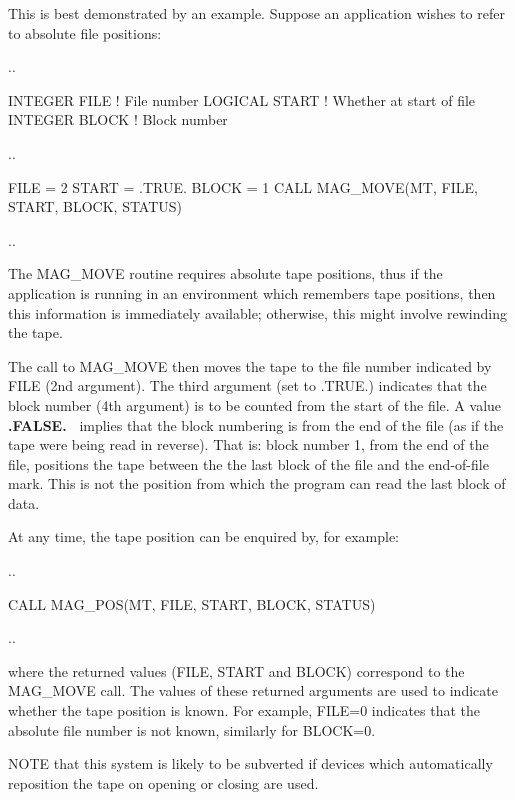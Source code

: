 \documentclass[11pt]{starlink}
\begin{document}
This is best demonstrated by an example. Suppose an application wishes
to refer to absolute file positions:

\begin{small}
\begin{terminalv}
..

INTEGER FILE                 ! File number
LOGICAL START                ! Whether at start of file
INTEGER BLOCK                ! Block number

..

FILE = 2
START = .TRUE.
BLOCK = 1
CALL MAG_MOVE(MT, FILE, START, BLOCK, STATUS)

..
\end{terminalv}
\end{small}

The MAG\_MOVE routine requires absolute tape positions, thus if the
application is running in an environment which remembers tape positions,
then this information is immediately available;  otherwise, this might
involve rewinding the tape.

The call to MAG\_MOVE then moves the tape to the file number indicated by
FILE (2nd argument).
The third argument (set to .TRUE.) indicates that the block number
(4th argument) is to be counted from the start of the file.
A value \textbf{.FALSE.\ } implies that the block numbering is from the end of the
file (as if the tape were being read in reverse). That is: block number 1,
from the end of the file, positions the tape between the the last block of
the file and the end-of-file mark. This is not the position from which the
program can read the last block of data.

At any time, the tape position can be enquired by, for example:

\begin{small}
\begin{terminalv}
..

CALL MAG_POS(MT, FILE, START, BLOCK, STATUS)

..
\end{terminalv}
\end{small}

where the returned values (FILE, START and BLOCK) correspond to the
MAG\_MOVE call. The values of these returned arguments are used to
indicate whether the tape position is known. For example, FILE=0
indicates that the absolute file number is not known, similarly for
BLOCK=0.

NOTE that this system is likely to be subverted if devices which automatically
reposition the tape on opening or closing are used.
\end{document}

